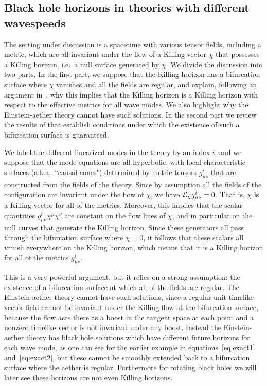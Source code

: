 \documentclass[12pt]{article}
\numberwithin{equation}{section}
\def\m{\mu}
\def\n{\nu}
\begin{document}
\subsection{Black hole horizons in theories with different wavespeeds}
\label{sec:horizons}



The setting under discussion is a spacetime with various tensor fields, 
including a metric, which are all invariant under the flow of 
a Killing vector $\chi$ that possesses a Killing horizon, i.e.\ 
a null surface generated by $\chi$. 
We divide the discussion into two 
parts. In the first part, we suppose that the Killing horizon 
has a bifurcation surface 
where $\chi$ vanishes and all the fields
are regular, and explain,
following an argument in~\cite{Jacobson:1993vj},
why this implies that the Killing horizon is a 
Killing horizon with respect to the effective metrics for all wave modes.
We also highlight why the Einstein-aether theory cannot have such solutions.
In the second part we review the results of \cite{Racz:1995nh} that establish conditions under which the existence of such a bifurcation surface 
is guaranteed.

We label the different linearized modes in the theory by an index $i$, 
and  we suppose that the mode equations are all hyperbolic, with local
characteristic surfaces (a.k.a.\ ``causal cones") determined by metric tensors
$g^i_{\m\n}$ that are constructed from the fields of the theory. 
Since by assumption all the fields of the configuration are invariant under the flow
of $\chi$, we have ${\cal L}_\chi g^i_{\m\n}=0$. That is, $\chi$ is a
Killing vector for all of the metrics. Moreover, this implies that 
the scalar quantities $g^i_{\m\n}\chi^\m\chi^\n$ are constant on the flow lines
of $\chi$, and in particular on the null curves that generate the Killing horizon. 
Since these generators all pass through the bifurcation surface 
where $\chi=0$, it follows that these scalars 
all vanish everywhere on the Killing horizon, which means that 
it is a Killing horizon
for all of the metrics $g^i_{\m\n}$. 


This is a very powerful argument, but it relies on a strong
assumption: the existence of a bifurcation surface at which all 
of the fields are regular. 
The Einstein-aether theory cannot have such solutions,
since a regular unit timelike vector field cannot be  invariant under the Killing flow at the bifurcation surface, because the flow acts there as a boost in the tangent space at each point and a nonzero 
timelike vector is not invariant under any boost. 
Instead the Einstein-aether theory has black hole solutions which have different future horizons for each wave mode, as one can see for the earlier example in equations~\eqref{eq:exact1} and~\eqref{eq:exact2}, but these cannot be smoothly extended back to a bifurcation surface where the aether is regular.
Furthermore for rotating black holes we will later see these horizons are not even Killing horizons.
\end{document}
